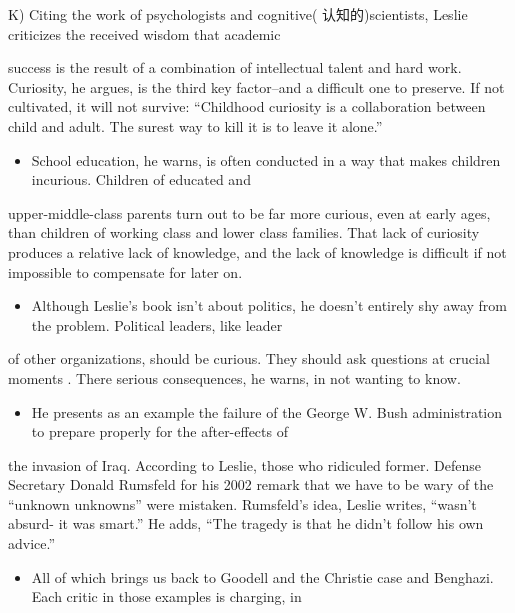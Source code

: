 \documentclass[UTF8,11pt]{ctexart}
\begin{document}
K) Citing the work of psychologists and cognitive( 认知的)scientists, Leslie criticizes the received wisdom that academic


success is the result of a combination of intellectual talent and hard work. Curiosity, he argues, is the third key factor--and a difficult one to preserve. If not cultivated, it will not survive: “Childhood curiosity is a collaboration between child and adult. The surest way to kill it is to leave it alone.”


\begin{itemize}[leftmargin=2em,itemsep=.2em,topsep=.4em]\item[L.] School education, he warns, is often conducted in a way that makes children incurious. Children of educated and
\end{itemize}

upper-middle-class parents turn out to be far more curious, even at early ages, than children of working class and lower class families. That lack of curiosity produces a relative lack of knowledge, and the lack of knowledge is difficult if not impossible to compensate for later on.


\begin{itemize}[leftmargin=2em,itemsep=.2em,topsep=.4em]\item[M.] Although Leslie’s book isn’t about politics, he doesn’t entirely shy away from the problem. Political leaders, like leader
\end{itemize}

of other organizations, should be curious. They should ask questions at crucial moments . There serious consequences, he warns, in not wanting to know.


\begin{itemize}[leftmargin=2em,itemsep=.2em,topsep=.4em]\item[N.] He presents as an example the failure of the George W. Bush administration to prepare properly for the after-effects of
\end{itemize}

the invasion of Iraq. According to Leslie, those who ridiculed former. Defense Secretary Donald Rumsfeld for his 2002 remark that we have to be wary of the “unknown unknowns” were mistaken. Rumsfeld’s idea, Leslie writes, “wasn’t absurd- it was smart.” He adds, “The tragedy is that he didn’t follow his own advice.”


\begin{itemize}[leftmargin=2em,itemsep=.2em,topsep=.4em]\item[O.] All of which brings us back to Goodell and the Christie case and Benghazi. Each critic in those examples is charging, in
\end{itemize}
\end{document}
